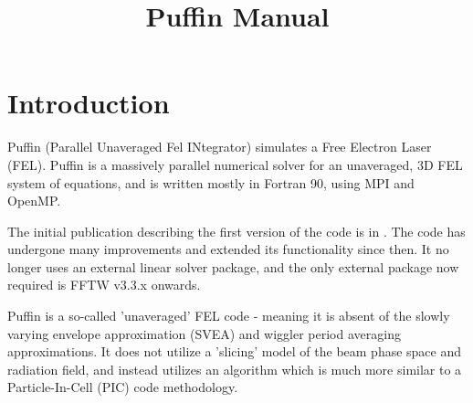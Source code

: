 \documentclass[12pt]{article}%
\begin{document}
\title{Puffin Manual}

\maketitle

\newpage

\tableofcontents

\newpage

\section{Introduction}





Puffin (Parallel Unaveraged Fel INtegrator) simulates a Free Electron Laser (FEL). Puffin is a massively parallel numerical solver for an unaveraged, 3D FEL system of equations, and is written mostly in Fortran 90, using MPI and OpenMP.

The initial publication describing the first version of the code is in \cite{puffin}. The code has undergone many improvements and extended its functionality since then. It no longer uses an external linear solver package, and the only external package now required is FFTW v3.3.x onwards.

Puffin is a so-called 'unaveraged' FEL code - meaning it is absent of the slowly varying envelope approximation (SVEA) and wiggler period averaging approximations. It does not utilize a 'slicing' model of the beam phase space and radiation field, and instead utilizes an algorithm which is much more similar to a Particle-In-Cell (PIC) code methodology.
\end{document}
